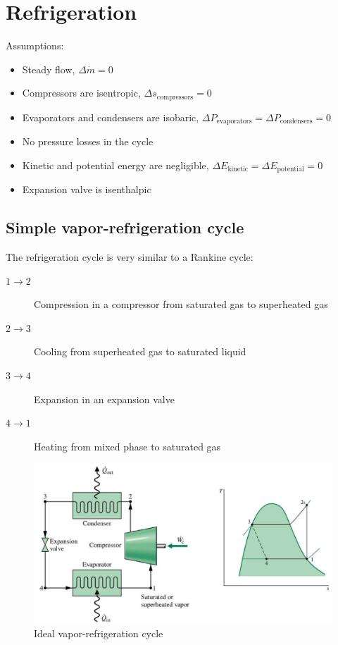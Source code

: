 \documentclass[10pt, twocolumn]{article}
\begin{document}
\section{Refrigeration}
Assumptions:
\begin{itemize}
  \item Steady flow, \(\Delta \dot{m} = 0\)
  \item Compressors are isentropic, \(\Delta s_\mathrm{compressors} = 0\)
  \item Evaporators and condensers are isobaric, \(\Delta P_\mathrm{evaporators} = \Delta P_\mathrm{condensers} = 0\)
  \item No pressure losses in the cycle
  \item Kinetic and potential energy are negligible, \(\Delta E_\mathrm{kinetic} = \Delta E_\mathrm{potential} = 0\)
  \item Expansion valve is isenthalpic
\end{itemize}


\subsection{Simple vapor-refrigeration cycle}
The refrigeration cycle is very similar to a Rankine cycle:
\begin{description}
  \item[\(1 \rightarrow 2\)] Compression in a compressor from saturated gas to superheated gas
  \item[\(2 \rightarrow 3\)] Cooling from superheated gas to saturated liquid
  \item[\(3 \rightarrow 4\)] Expansion in an expansion valve
  \item[\(4 \rightarrow 1\)] Heating from mixed phase to saturated gas
\end{description}

\begin{figure}[ht] %
  \centering
  \caption{Ideal vapor-refrigeration cycle}
  \label{fig:ideal-vapor-refrigeration}
  \includegraphics[width = 0.9\linewidth]{../../images/mech/mech-351/ideal-vapor-refrigeration-cycle.png}
\end{figure}
\end{document}

